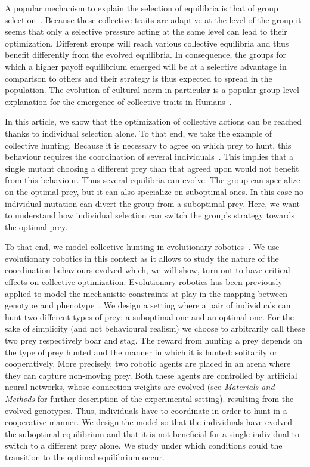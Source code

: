A popular mechanism to explain the selection of equilibria is that of group selection~\citep{Boyd1990}. Because these collective traits are adaptive at the level of the group it seems that only a selective pressure acting at the same level can lead to their optimization. Different groups will reach various collective equilibria and thus benefit differently from the evolved equilibria. In consequence, the groups for which a higher payoff equilibrium emerged will be at a selective advantage in comparison to others and their strategy is thus expected to spread in the population. The evolution of cultural norm in particular is a popular group-level explanation for the emergence of collective traits in Humans~\citep{Boyd2002, Binmore2011, Smaldino2014}.

In this article, we show that the optimization of collective actions can be reached thanks to individual selection alone. To that end, we take the example of collective hunting. Because it is necessary to agree on which prey to hunt, this behaviour requires the coordination of several individuals~\citep{Alvard2002, Alvard2003, Drea2009a}. This implies that a single mutant choosing a different prey than that agreed upon would not benefit from this behaviour. Thus several equilibria can evolve. The group can specialize on the optimal prey, but it can also specialize on suboptimal ones. In this case no individual mutation can divert the group from a suboptimal prey. Here, we want to understand how individual selection can switch the group's strategy towards the optimal prey.

To that end, we model collective hunting in evolutionary robotics~\citep{Nolfi2000, Doncieux2015a}. We use evolutionary robotics in this context as it allows to study the nature of the coordination behaviours evolved which, we will show, turn out to have critical effects on collective optimization. Evolutionary robotics has been previously applied to model the mechanistic constraints at play in the mapping between genotype and phenotype~\citep{Mitri2013, Trianni2014b, Bernard2016a}. We design a setting where a pair of individuals can hunt two different types of prey: a suboptimal one and an optimal one. For the sake of simplicity (and not behavioural realism) we choose to arbitrarily call these two prey respectively boar and stag. The reward from hunting a prey depends on the type of prey hunted and the manner in which it is hunted: solitarily or cooperatively. More precisely, two robotic agents are placed in an arena where they can capture non-moving prey. Both these agents are controlled by artificial neural networks, whose connection weights are evolved (see \emph{Materials and Methods} for further description of the experimental setting). resulting from the evolved genotypes. Thus, individuals have to coordinate in order to hunt in a cooperative manner. We design the model so that the individuals have evolved the suboptimal equilibrium and that it is not beneficial for a single individual to switch to a different prey alone. We study under which conditions could the transition to the optimal equilibrium occur.


